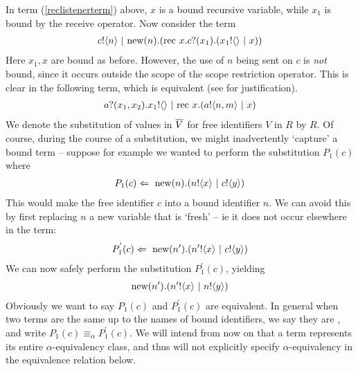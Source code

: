 	In term (\ref{reclistenerterm}) above, $x$ is a bound recursive variable, while $x_1$ is bound by the receive operator. Now consider the term
	\begin{align}
		{c}!\langle{n}\rangle \ |\  \text{new}({n}).(\text{rec }{x}.{c}?({x_1}).({x_1}!\langle{}\rangle \ |\  x))
	\end{align}
	Here $x_1, x$ are bound as before.  However, the use of $n$ being sent on $c$ is \emph{not} bound, since it occurs outside the scope of the scope restriction operator.  This is clear in the following term, which is equivalent (see  for justification).
	\begin{align}
		{a}?({x_1,x_2}).{x_1}!\langle{}\rangle \ |\  \text{rec }{x}.({a}!\langle{n,m}\rangle \ |\  x)
	\end{align}
	We denote the substitution of values in $\overline{V}$ for free identifiers $V$ in $R$ by $R$.  Of course, during the course of a substitution, we might inadvertently `capture' a bound term -- suppose for example we wanted to perform the substitution $P_1(c)$ where
\begin{align}
	P_1(c) \Leftarrow\  \text{new}({n}).({n}!\langle{x}\rangle \ |\  {c}!\langle{y}\rangle)	
\end{align}	
This would make the free identifier $c$ into a bound identifier $n$.  We can avoid this by first replacing $n$ a new variable that is `fresh' -- ie it does not occur elsewhere in the term:
\begin{align}
	P_1^{'}(c) \Leftarrow\  \text{new}({n'}).({n'}!\langle{x}\rangle \ |\  {c}!\langle{y}\rangle)
\end{align}
We can now safely perform the substitution $P_1^{'}(c)$, yielding
\begin{align}
	\text{new}({n'}).({n'}!\langle{x}\rangle \ |\  {n}!\langle{y}\rangle)
\end{align}
	Obviously we want to say $P_1(c)$ and $P_1^{'}(c)$ are equivalent.  In general when two terms are the same up to the names of bound identifiers, we say they are , and write $P_1(c) \equiv_\alpha P_1^{'}(c)$.  We will intend from now on that a term represents its entire $\alpha$-equivalency class, and thus will not explicitly specify $\alpha$-equivalency in the equivalence relation below.

